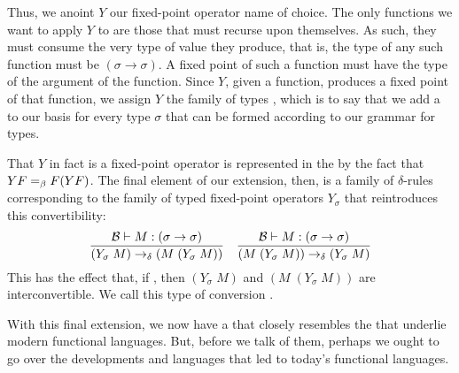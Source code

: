 Thus, we anoint $Y$ our fixed-point operator name of choice. The only functions we want to apply $Y$ to are those that must recurse upon themselves. As such, they must consume the very type of value they produce, that is, the type of any such function must be $(\sigma \to \sigma)$. A fixed point of such a function must have the type of the argument of the function.  Since $Y$, given a function, produces a fixed point of that function, we assign $Y$ the family of types , which is to say that we add a  to our basis \basis{} for every type $\sigma$ that can be formed according to our grammar for types.

That $Y$ in fact is a fixed-point operator is represented in the \lambdacalc by the fact that $Y F =_{\beta} F (Y F)$. The final element of our extension, then, is a family of $\delta$-rules corresponding to the family of typed fixed-point operators $Y_{\sigma}$ that reintroduces this convertibility:
\[
\frac{\basis \turnstile \stmt{M}{(\sigma \to \sigma)}}%
{(Y_{\sigma}\; M) \dred (M\; (Y_{\sigma}\; M))} 
\quad 
\frac{\basis \turnstile \stmt{M}{(\sigma \to \sigma)}}%
{(M\; (Y_{\sigma}\; M)) \dred (Y_{\sigma}\; M)}
\]
This has the effect that, if , then $(Y_{\sigma}\; M)$ and $(M\; (Y_{\sigma}\; M))$ are interconvertible. We call this type of conversion .

With this final extension, we now have a \lambdacalc that closely resembles the \lambdacalcs that underlie modern functional languages. But, before we talk of them, perhaps we ought to go over the developments and languages that led to today's functional languages.